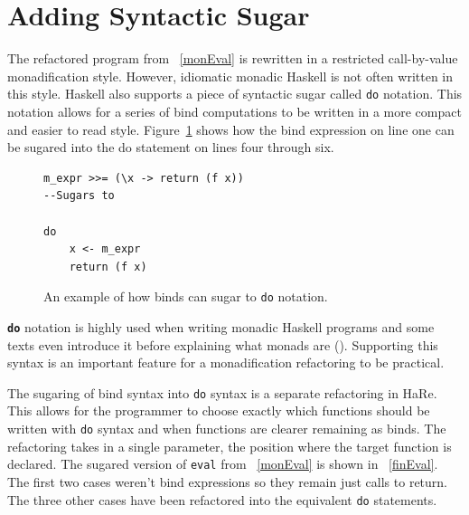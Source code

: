 \DIFaddbegin {}

\DIFaddend \section{Adding Syntactic Sugar}

The refactored program from \DIFdelbegin {}\DIFdelend \DIFaddbegin {}\DIFaddend ~\ref{monEval} is rewritten in a restricted call-by-value monadification style. However, idiomatic monadic Haskell is not often written in this style. Haskell also supports a piece of syntactic sugar called \texttt{do} notation. This notation allows for a series of bind computations to be written in a more compact and easier to read style. Figure~\ref{doEx} shows how the bind expression on line one can be sugared into the do statement on lines four through six.

\begin{figure}[t]
\begin{lstlisting}
m_expr >>= (\x -> return (f x))
--Sugars to

do
	x <- m_expr
	return (f x)
\end{lstlisting}
\caption{An example of how binds can sugar to \texttt{do} notation.}
\label{doEx}
\end{figure}

\textbf{\texttt{do}} notation is highly used when writing monadic Haskell programs and some texts even introduce it before explaining what monads are (\DIFdelbegin {}\DIFdelend \DIFaddbegin {}\DIFaddend \cite{learnYou}). Supporting this syntax is an important feature for a monadification refactoring to be practical. 

The sugaring of bind syntax into \texttt{do} syntax is a separate refactoring in HaRe. This allows for the programmer to choose exactly which functions should be written with \texttt{do} syntax and when functions are clearer remaining as binds. The refactoring takes in a single parameter, the position where the target function is declared. The sugared version of \texttt{eval} from \DIFdelbegin {}\DIFdelend \DIFaddbegin {}\DIFaddend ~\ref{monEval} is shown in \DIFdelbegin {}\DIFdelend \DIFaddbegin {}\DIFaddend ~\ref{finEval}. The first two cases weren't bind expressions so they remain just calls to return. The three other cases have been refactored into the equivalent \texttt{do} statements.


